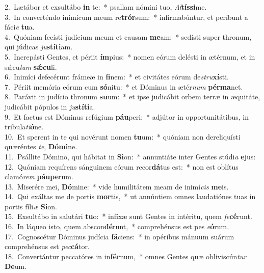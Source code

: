 {2.~}Lætábor et exsultábo \textbf{in} te:~* psallam nómini tuo, \textit{Al}\textbf{tís}\textbf{si}me.\\
{3.~}In converténdo inimícum meum re\textbf{trór}sum:~* infirmabúntur, et períbunt a fáci\textit{e} \textbf{tu}a.\\
{4.~}Quóniam fecísti judícium meum et causam \textbf{me}am:~* sedísti super thronum, qui júdicas \textit{ju}\textbf{stí}\textbf{ti}am.\\
{5.~}Increpásti Gentes, et périit \textbf{ím}pius:~* nomen eórum delésti in ætérnum, et in sǽcu\textit{lum} \textbf{sǽ}\textbf{cu}li.\\
{6.~}Inimíci defecérunt frámeæ in \textbf{fi}nem:~* et civitátes eórum de\textit{stru}\textbf{xí}sti.\\
{7.~}Périit memória eórum cum \textbf{só}nitu:~* et Dóminus in ætér\textit{num} \textbf{pér}\textbf{ma}net.\\
{8.~}Parávit in judício thronum \textbf{su}um:~* et ipse judicábit orbem terræ in æquitáte, judicábit pópulos in \textit{ju}\textbf{stí}\textbf{ti}a.\\
{9.~}Et factus est Dóminus refúgium \textbf{páu}peri:~* adjútor in opportunitátibus, in tribula\textit{ti}\textbf{ó}ne.\\
{10.~}Et sperent in te qui novérunt nomen \textbf{tu}um:~* quóniam non dereliquísti quæréntes \textit{te}, \textbf{Dó}\textbf{mi}ne.\\
{11.~}Psállite Dómino, qui hábitat in \textbf{Si}on:~* annuntiáte inter Gentes stúdi\textit{a} \textbf{e}jus:\\
{12.~}Quóniam requírens sánguinem eórum recor\textbf{dá}tus est:~* non est oblítus clamó\textit{rem} \textbf{páu}\textbf{pe}rum.\\
{13.~}Miserére mei, \textbf{Dó}mine:~* vide humilitátem meam de inimí\textit{cis} \textbf{me}is.\\
{14.~}Qui exáltas me de portis \textbf{mor}tis,~* ut annúntiem omnes laudatiónes tuas in portis fíli\textit{æ} \textbf{Si}on.\\
{15.~}Exsultábo in salutári \textbf{tu}o:~* infíxæ sunt Gentes in intéritu, quem \textit{fe}\textbf{cé}runt.\\
{16.~}In láqueo isto, quem abscon\textbf{dé}runt,~* comprehénsus est pes \textit{e}\textbf{ó}rum.\\
{17.~}Cognoscétur Dóminus judícia \textbf{fá}ciens:~* in opéribus mánuum suárum comprehénsus est \textit{pec}\textbf{cá}tor.\\
{18.~}Convertántur peccatóres in in\textbf{fér}num,~* omnes Gentes quæ obliviscún\textit{tur} \textbf{De}um.\\
